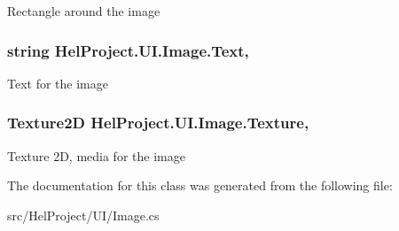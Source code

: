 Rectangle around the image 

\hypertarget{class_hel_project_1_1_u_i_1_1_image_a5ee12296f31949495524fba982677dc4}{}
\subsubsection[{Text}]{\setlength{\rightskip}{0pt plus 5cm}string Hel\+Project.\+U\+I.\+Image.\+Text\hspace{0.3cm}{\ttfamily [get]}, {\ttfamily [set]}}\label{class_hel_project_1_1_u_i_1_1_image_a5ee12296f31949495524fba982677dc4}


Text for the image 

\hypertarget{class_hel_project_1_1_u_i_1_1_image_ac8ab89b0c7e2d4475dcfb514b213d783}{}
\subsubsection[{Texture}]{\setlength{\rightskip}{0pt plus 5cm}Texture2\+D Hel\+Project.\+U\+I.\+Image.\+Texture\hspace{0.3cm}{\ttfamily [get]}, {\ttfamily [set]}}\label{class_hel_project_1_1_u_i_1_1_image_ac8ab89b0c7e2d4475dcfb514b213d783}


Texture 2\+D, media for the image 



The documentation for this class was generated from the following file\+:\begin{DoxyCompactItemize}
\item 
src/\+Hel\+Project/\+U\+I/Image.\+cs\end{DoxyCompactItemize}
